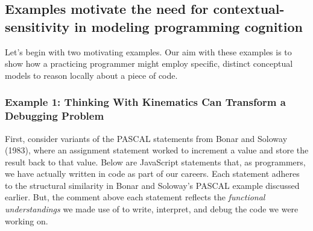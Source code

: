\subsection{Examples motivate the need for contextual-sensitivity in modeling programming cognition}\label{examples-motivate-the-need-for-contextual-sensitivity-in-modeling-programming-cognition}

Let's begin with two motivating examples. Our aim with these examples is
to show how a practicing programmer might employ specific, distinct
conceptual models to reason locally about a piece of code.

\subsubsection{Example 1: Thinking With Kinematics Can Transform a Debugging Problem}

First,
consider variants of the PASCAL statements from Bonar and Soloway
(1983), where an assignment statement worked to increment a value and
store the result back to that value. Below are JavaScript statements that, as programmers, we have actually written in code as part of our careers. Each statement
adheres to the structural similarity in Bonar and Soloway's PASCAL example \cite{bonar_uncovering_1983} discussed earlier. But, the comment above each statement reflects the \emph{functional understandings} \cite{disessa_models_1986} we made use of to write, interpret, and debug the code we were working on.

\begin{Shaded}
\begin{Highlighting}[numbers=left,,]
\OperatorTok{=} \OperatorTok{+} 

\OperatorTok{=} \OperatorTok{+} 

\OperatorTok{=} \OperatorTok{+} 

\OperatorTok{=} \OperatorTok{+} 

\OperatorTok{=} \OperatorTok{+} \NormalTok{()}
\end{Highlighting}
\end{Shaded}

